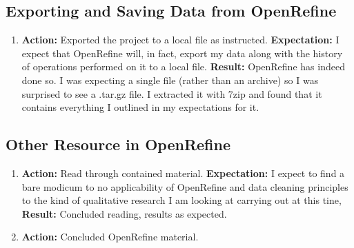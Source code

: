 \documentclass{article}
\begin{document}
    \subsection{Exporting and Saving Data from OpenRefine}
    \begin{enumerate}
        \item \textbf{Action: }Exported the project to a local file as instructed.
        \subitem \textbf{Expectation: }I expect that OpenRefine will, in fact, export my data along with the history of operations performed on it to a local file.
        \subitem \textbf{Result: }OpenRefine has indeed done so. I was expecting a single file (rather than an archive) so I was surprised to see a .tar.gz file. I extracted it with 7zip and found that it contains everything I outlined in my expectations for it.
    \end{enumerate}
    \subsection{Other Resource in OpenRefine}
    \begin{enumerate}
        \item \textbf{Action: }Read through contained material.
        \subitem \textbf{Expectation: }I expect to find a bare modicum to no applicability of OpenRefine and data cleaning principles to the kind of qualitative research I am looking at carrying out at this tine,
        \subitem \textbf{Result: }Concluded reading, results as expected.
        \item \textbf{Action: }Concluded OpenRefine material.
    \end{enumerate}
\end{document}
